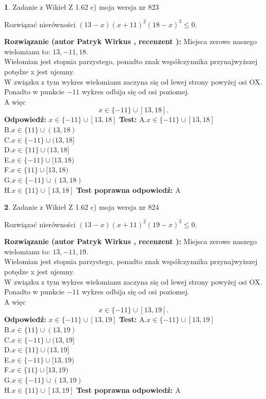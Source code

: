 \documentclass[12pt, a4paper]{article}
\theoremstyle{definition} %
\newtheorem{zad}{}
\newcommand{\zadStart}[1]{\begin{zad}#1\newline}
\newcommand{\zadStop}{\end{zad}}
\newcommand{\rozwStart}[2]{\noindent \textbf{Rozwiązanie (autor #1 , recenzent #2): }\newline}
\newcommand{\rozwStop}{\newline}
\newcommand{\odpStart}{\noindent \textbf{Odpowiedź:}\newline}
\newcommand{\odpStop}{\newline}
\newcommand{\testStart}{\noindent \textbf{Test:}\newline}
\newcommand{\testStop}{\newline}
\newcommand{\kluczStart}{\noindent \textbf{Test poprawna odpowiedź:}\newline}
\newcommand{\kluczStop}{\newline}
\begin{document}
\zadStart{Zadanie z Wikieł Z 1.62 c) moja wersja nr 823}

Rozwiązać nierówności $(13-x)(x+11)^{2}(18-x)^{3}\le0$.
\zadStop
\rozwStart{Patryk Wirkus}{}
Miejsca zerowe naszego wielomianu to: $13, -11, 18$.\\
Wielomian jest stopnia parzystego, ponadto znak współczynnika przy\linebreak najwyższej potędze x jest ujemny.\\ W związku z tym wykres wielomianu zaczyna się od lewej strony powyżej osi OX.\\
Ponadto w punkcie $-11$ wykres odbija się od osi poziomej.\\
A więc $$x \in \{-11\} \cup [13,18].$$
\rozwStop
\odpStart
$x \in \{-11\} \cup [13,18]$
\odpStop
\testStart
A.$x \in \{-11\} \cup [13,18]$\\
B.$x \in \{11\} \cup (13,18)$\\
C.$x \in \{-11\} \cup (13,18]$\\
D.$x \in \{11\} \cup (13,18]$\\
E.$x \in \{-11\} \cup [13,18)$\\
F.$x \in \{11\} \cup [13,18)$\\
G.$x \in \{-11\} \cup (13,18)$\\
H.$x \in \{11\} \cup [13,18]$
\testStop
\kluczStart
A
\kluczStop



\zadStart{Zadanie z Wikieł Z 1.62 c) moja wersja nr 824}

Rozwiązać nierówności $(13-x)(x+11)^{2}(19-x)^{3}\le0$.
\zadStop
\rozwStart{Patryk Wirkus}{}
Miejsca zerowe naszego wielomianu to: $13, -11, 19$.\\
Wielomian jest stopnia parzystego, ponadto znak współczynnika przy\linebreak najwyższej potędze x jest ujemny.\\ W związku z tym wykres wielomianu zaczyna się od lewej strony powyżej osi OX.\\
Ponadto w punkcie $-11$ wykres odbija się od osi poziomej.\\
A więc $$x \in \{-11\} \cup [13,19].$$
\rozwStop
\odpStart
$x \in \{-11\} \cup [13,19]$
\odpStop
\testStart
A.$x \in \{-11\} \cup [13,19]$\\
B.$x \in \{11\} \cup (13,19)$\\
C.$x \in \{-11\} \cup (13,19]$\\
D.$x \in \{11\} \cup (13,19]$\\
E.$x \in \{-11\} \cup [13,19)$\\
F.$x \in \{11\} \cup [13,19)$\\
G.$x \in \{-11\} \cup (13,19)$\\
H.$x \in \{11\} \cup [13,19]$
\testStop
\kluczStart
A
\kluczStop
\end{document}

